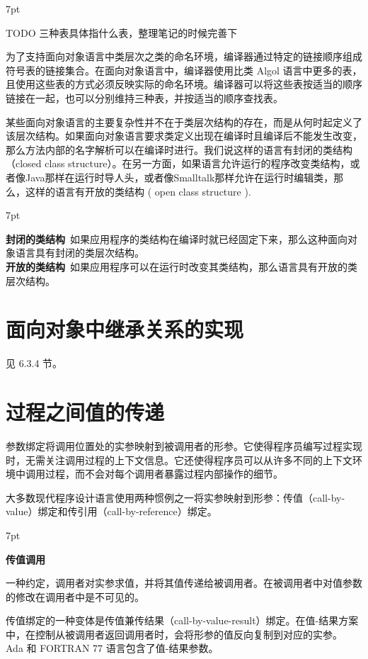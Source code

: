 \documentclass[12pt]{article}
\newenvironment{formal}{%
\def\FrameCommand{%
\hspace{1pt}%
{\color{DarkBlue}\vrule width 2pt}%
{\color{formalshade}\vrule width 4pt}%
\colorbox{formalshade}%
}%
\MakeFramed{\advance\hsize-\width\FrameRestore}%
\noindent\hspace{-4.55pt}%
\begin{adjustwidth}{}{7pt}%
\vspace{2pt}\vspace{2pt}%
}
{%
\vspace{2pt}\end{adjustwidth}\endMakeFramed%
}
\begin{document}
\begin{formal}
TODO 三种表具体指什么表，整理笔记的时候完善下
\end{formal}
为了支持面向对象语言中类层次之类的命名环境，编译器通过特定的链接顺序组成符号表的链接集合。在面向对象语言中，编译器使用比类 Algol 语言中更多的表，且使用这些表的方式必须反映实际的命名环境。编译器可以将这些表按适当的顺序链接在一起，也可以分别维持三种表，并按适当的顺序查找表。

某些面向对象语言的主要复杂性并不在于类层次结构的存在，而是从何时起定义了该层次结构。如果面向对象语言要求类定义出现在编译时且编译后不能发生改变，那么方法内部的名字解析可以在编译时进行。我们说这样的语言有封闭的类结构（closed class structure）。在另一方面，如果语言允许运行的程序改变类结构，或者像Java那样在运行时导人头，或者像Smalltalk那样允许在运行时编辑类，那么，这样的语言有开放的类结构 ( open class structure ).

\begin{formal}
\textbf{封闭的类结构}\ 如果应用程序的类结构在编译时就已经固定下来，那么这种面向对象语言具有封闭的类层次结构。\\
\textbf{开放的类结构}\ 如果应用程序可以在运行时改变其类结构，那么语言具有开放的类层次结构。
\end{formal}

\section*{面向对象中继承关系的实现}

见 6.3.4 节。

\section*{过程之间值的传递}

参数绑定将调用位置处的实参映射到被调用者的形参。它使得程序员编写过程实现时，无需关注调用过程的上下文信息。它还使得程序员可以从许多不同的上下文环境中调用过程，而不会对每个调用者暴露过程内部操作的细节。

大多数现代程序设计语言使用两种惯例之一将实参映射到形参：传值（call-by-value）绑定和传引用（call-by-reference）绑定。

\begin{formal}
\textbf{传值调用} \par
一种约定，调用者对实参求值，并将其值传递给被调用者。在被调用者中对值参数的修改在调用者中是不可见的。
\end{formal}

传值绑定的一种变体是传值兼传结果（call-by-value-result）绑定。在值-结果方案中，在控制从被调用者返回调用者时，会将形参的值反向复制到对应的实参。 Ada 和 FORTRAN 77 语言包含了值-结果参数。
\end{document}

